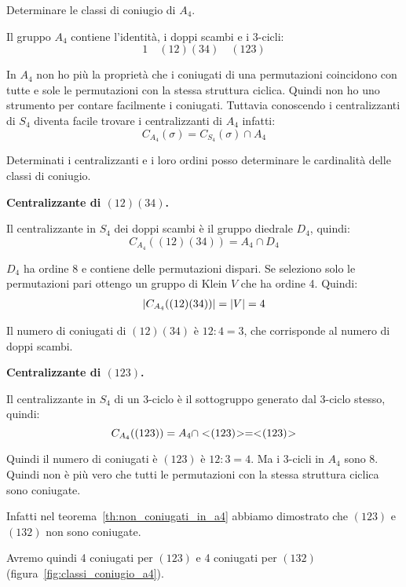 \begin{esercizio}
	Determinare le classi di coniugio di $A_4$.
\end{esercizio}

\begin{soluzione}
	Il gruppo $A_4$ contiene l'identità, i doppi scambi e i 3-cicli:
	\begin{equation}
		1 \quad (12)(34) \quad (123)
	\end{equation}

	In $A_4$ non ho più la proprietà che i coniugati di una permutazioni coincidono con tutte e sole le permutazioni
	con la stessa struttura ciclica.
	Quindi non ho uno strumento per contare facilmente i coniugati.
	Tuttavia conoscendo i centralizzanti di $S_4$ diventa facile trovare i centralizzanti di $A_4$ infatti:
	\begin{equation}
		C_{A_4}(\sigma) = C_{S_4}(\sigma) \cap A_4
	\end{equation}

	Determinati i centralizzanti e i loro ordini posso determinare le cardinalità delle classi di coniugio.

	\textbf{Centralizzante di $(12)(34)$.}
	
	Il centralizzante in $S_4$ dei doppi scambi è il gruppo diedrale $D_4$, quindi:
	\begin{equation}
		C_{A_4}((12)(34)) = A_4 \cap D_4
	\end{equation}
	
	$D_4$ ha ordine 8 e contiene delle permutazioni dispari.
	Se seleziono solo le permutazioni pari ottengo un gruppo di Klein $V$ che ha ordine 4.
	Quindi:
	\begin{gather}
		\lvert C_{A_4}((12)(34)) \rvert = \lvert V \rvert = 4
	\end{gather}

	Il numero di coniugati di $(12)(34)$ è $12:4 = 3$, che corrisponde al numero di doppi scambi.

	\textbf{Centralizzante di $(123)$.}

	Il centralizzante in $S_4$ di un 3-ciclo è il sottogruppo generato dal 3-ciclo stesso, quindi:
	\begin{equation}
		C_{A_4}((123)) = A_4 \cap < \negmedspace (123) \negmedspace > = < \negmedspace (123) \negmedspace >
	\end{equation}

	Quindi il numero di coniugati è $(123)$ è $12:3 = 4$.
	Ma i 3-cicli in $A_4$ sono 8.
	Quindi non è più vero che tutti le permutazioni con la stessa struttura ciclica sono coniugate.

	Infatti nel teorema~\ref{th:non_coniugati_in_a4} abbiamo dimostrato che $(123)$ e $(132)$ non sono coniugate.

	Avremo quindi 4 coniugati per $(123)$ e 4 coniugati per $(132)$ (figura~\ref{fig:classi_coniugio_a4}).

\end{soluzione}

